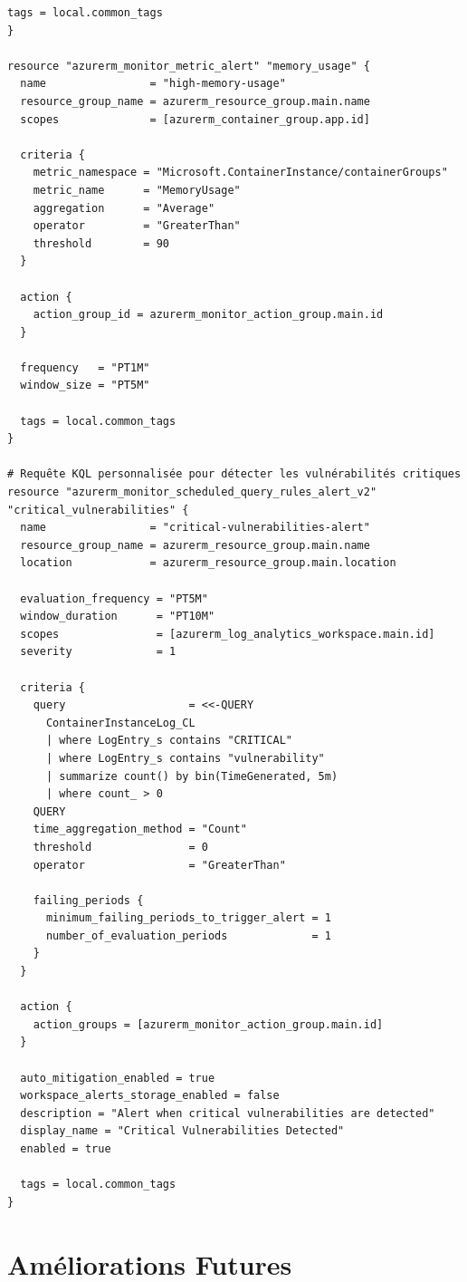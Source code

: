 \documentclass[12pt,a4paper]{report}
\begin{document}
\begin{lstlisting}[language=hcl, caption=Configuration Azure Monitor et alertes]
  tags = local.common_tags
}

resource "azurerm_monitor_metric_alert" "memory_usage" {
  name                = "high-memory-usage"
  resource_group_name = azurerm_resource_group.main.name
  scopes              = [azurerm_container_group.app.id]
  
  criteria {
    metric_namespace = "Microsoft.ContainerInstance/containerGroups"
    metric_name      = "MemoryUsage"
    aggregation      = "Average"
    operator         = "GreaterThan"
    threshold        = 90
  }
  
  action {
    action_group_id = azurerm_monitor_action_group.main.id
  }
  
  frequency   = "PT1M"
  window_size = "PT5M"
  
  tags = local.common_tags
}

# Requête KQL personnalisée pour détecter les vulnérabilités critiques
resource "azurerm_monitor_scheduled_query_rules_alert_v2" "critical_vulnerabilities" {
  name                = "critical-vulnerabilities-alert"
  resource_group_name = azurerm_resource_group.main.name
  location            = azurerm_resource_group.main.location
  
  evaluation_frequency = "PT5M"
  window_duration      = "PT10M"
  scopes               = [azurerm_log_analytics_workspace.main.id]
  severity             = 1
  
  criteria {
    query                   = <<-QUERY
      ContainerInstanceLog_CL
      | where LogEntry_s contains "CRITICAL"
      | where LogEntry_s contains "vulnerability"
      | summarize count() by bin(TimeGenerated, 5m)
      | where count_ > 0
    QUERY
    time_aggregation_method = "Count"
    threshold               = 0
    operator                = "GreaterThan"
    
    failing_periods {
      minimum_failing_periods_to_trigger_alert = 1
      number_of_evaluation_periods             = 1
    }
  }
  
  action {
    action_groups = [azurerm_monitor_action_group.main.id]
  }
  
  auto_mitigation_enabled = true
  workspace_alerts_storage_enabled = false
  description = "Alert when critical vulnerabilities are detected"
  display_name = "Critical Vulnerabilities Detected"
  enabled = true
  
  tags = local.common_tags
}
\end{lstlisting}

\section{Améliorations Futures}
\end{document}
